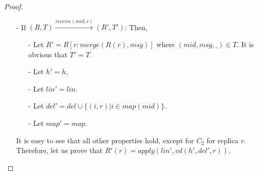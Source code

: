 \begin {proof}
\begin{itemize}
    \begin{itemize}
    \setlength{\itemsep}{0.5pt}
    \item[-] It is obvious that $R' = R$. Let $T' = T \cup \{ (\mathit{mid},R(r),r) \}$.

    \item[-] Let $h' = h$. 

    \item[-] Let $\mathit{lin}' = \mathit{lin}$.

    \item[-] Let $\mathit{del}' = \mathit{del}$. 
    
    \item[-] Let $\mathit{map}' = \mathit{map} \cup \{ (\mathit{mid},\mathit{vd}(h,\mathit{del},r)) \}$. 
    \end{itemize} 
    
    It is easy to see that all other properties hold, except for checking $C_1$ for $\mathit{mid}$. This holds obviously since we already know that $R(r) = \mathit{apply}(\mathit{lin},\mathit{vd}(h,\mathit{del},r)) = \mathit{apply}(\mathit{lin},\mathit{map}(\mathit{mid}))$. 

\item[-] If $(R,T) {\xrightarrow{\mathit{receive}(\mathit{mid},r)}} (R',T')$: Then,

    \begin{itemize}
    \setlength{\itemsep}{0.5pt}
    \item[-] Let $R' = R[ r: \mathit{merge}(R(r),\mathit{msg})]$ where $(\mathit{mid},\mathit{msg},\_) \in T$. It is obvious that $T' = T$. 

    \item[-] Let $h' = h$.

    \item[-] Let $\mathit{lin}' = \mathit{lin}$. 

    \item[-] Let $\mathit{del}' = \mathit{del} \cup \{ (i,r) \vert i \in \mathit{map}(\mathit{mid}) \}$. 
    
    \item[-] Let $\mathit{map}' = \mathit{map}$.
    \end{itemize} 
    
    It is easy to see that all other properties hold, except for $C_2$ for replica $r$. Therefore, let us prove that $R'(r) = \mathit{apply}(\mathit{lin}',\mathit{vd}(h',\mathit{del}',r))$. 
    

\end{itemize}
\end{proof}

